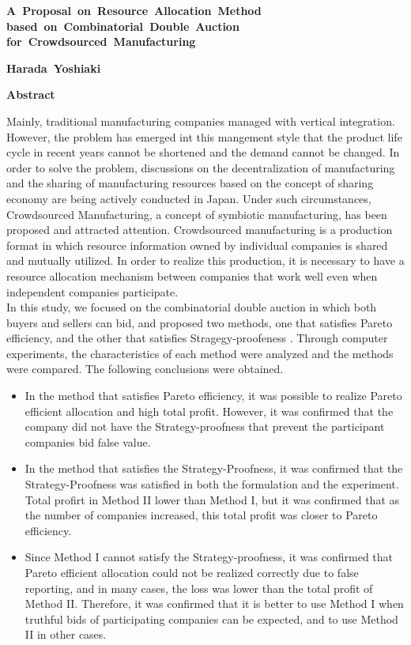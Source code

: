 \newpage
\thispagestyle{empty}
\begin{center}
\mbox{\LARGE{\bf{A Proposal on Resource Allocation Method }}}
\mbox{\LARGE{\bf{based on Combinatorial Double Auction}}}
\mbox{\LARGE{\bf{for Crowdsourced Manufacturing }}}

\vspace*{2mm}
\mbox{\Large{\bf{Harada Yoshiaki}}}

\vspace*{7mm}
{\LARGE\bf Abstract}
\end{center}
Mainly, traditional manufacturing companies managed  with vertical
integration. However, the problem has emerged int this mangement style that the
product life cycle in recent years cannot be shortened and the demand cannot be
changed. In order to solve the problem, discussions on the decentralization of
manufacturing and the sharing of manufacturing resources based on the concept of
sharing economy are being actively conducted in Japan. Under such circumstances,
Crowdsourced Manufacturing, a concept of symbiotic manufacturing, has been
proposed and attracted attention. Crowdsourced manufacturing is a production
format in which resource information owned by individual companies is shared and
mutually utilized. In order to realize this production, it is necessary to have
a resource allocation mechanism between companies that work well even
when independent companies participate. \\
In this study, we focused on the combinatorial double auction in which both buyers and sellers can bid, and proposed two methods, one that satisfies Pareto efficiency, and the other that satisfies Stragegy-proofeness . Through computer experiments, the characteristics of each method were analyzed and the methods were compared. The following conclusions were obtained.
\begin{itemize}
\item In the method that satisfies Pareto efficiency, it was possible to realize
  Pareto efficient allocation and high total profit.  However, it was confirmed
  that the company did not have the Strategy-proofness that prevent the
  participant companies bid false value.
\item  In the method that satisfies the Strategy-Proofness, it was confirmed
  that the Strategy-Proofness was satisfied in both the formulation and the
  experiment. Total profirt in Method II lower than Method I, but it was confirmed that as the number of companies increased, this
  total profit was closer to Pareto efficiency.
\item  Since Method I cannot satisfy the Strategy-proofness, it was confirmed
  that Pareto efficient allocation could not be realized correctly due to false
  reporting, and in many cases, the loss was lower than the total profit of Method II.
Therefore, it was confirmed that it is better to use Method I when truthful bids
of participating companies can be expected, and to use Method II in other cases.
\end{itemize}